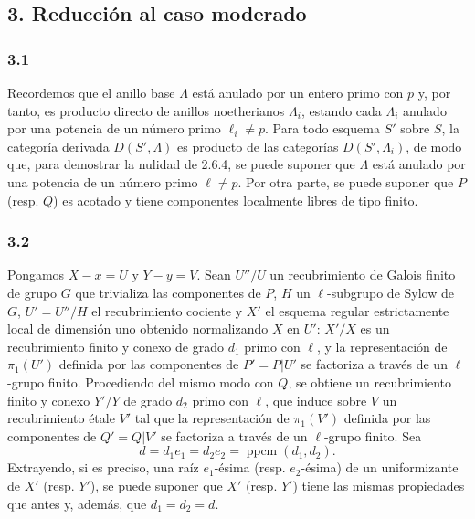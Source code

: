 \subsection*{3. Reducción al caso moderado}

\subsubsection*{3.1}
Recordemos que el anillo base $\Lambda$ está anulado por un entero primo con $p$ y, por tanto, es producto directo de anillos noetherianos $\Lambda_i$, estando cada $\Lambda_i$ anulado por una potencia de un número primo $\ell_i\ne p$. Para todo esquema $S'$ sobre $S$, la categoría derivada $D(S',\Lambda)$ es producto de las categorías $D(S',\Lambda_i)$, de modo que, para demostrar la nulidad de 2.6.4, se puede suponer que $\Lambda$ está anulado por una potencia de un número primo $\ell\ne p$. Por otra parte, se puede suponer que $P$ (resp. $Q$) es acotado y tiene componentes localmente libres de tipo finito.

\subsubsection*{3.2}
Pongamos $X-x=U$ y $Y-y=V$. Sean $U''/U$ un recubrimiento de Galois finito de grupo $G$ que trivializa las componentes de $P$, $H$ un $\ell$-subgrupo de Sylow de $G$, $U'=U''/H$ el recubrimiento cociente y $X'$ el esquema regular estrictamente local de dimensión uno obtenido normalizando $X$ en $U'$: $X'/X$ es un recubrimiento finito y conexo de grado $d_1$ primo con $\ell$, y la representación de $\pi_1(U')$ definida por las componentes de $P'=P|U'$ se factoriza a través de un $\ell$-grupo finito. Procediendo del mismo modo con $Q$, se obtiene un recubrimiento finito y conexo $Y'/Y$ de grado $d_2$ primo con $\ell$, que induce sobre $V$ un recubrimiento étale $V'$ tal que la representación de $\pi_1(V')$ definida por las componentes de $Q'=Q|V'$ se factoriza a través de un $\ell$-grupo finito. Sea
\[
d=d_1e_1=d_2e_2=\operatorname{ppcm}(d_1,d_2).
\]
Extrayendo, si es preciso, una raíz $e_1$-ésima (resp. $e_2$-ésima) de un uniformizante de $X'$ (resp. $Y'$), se puede suponer que $X'$ (resp. $Y'$) tiene las mismas propiedades que antes y, además, que $d_1=d_2=d$.

